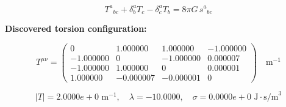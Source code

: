 
\begin{equation}
  T^a{}_{bc} + \delta^a_b T_c - \delta^a_c T_b = 8\pi G \, s^a{}_{bc}
\end{equation}

\textbf{Discovered torsion configuration:}

\begin{equation}
  T^{\mu\nu} = \begin{pmatrix}
    0 & 1.000000 & 1.000000 & -1.000000 \\
    -1.000000 & 0 & -1.000000 & 0.000007 \\
    -1.000000 & 1.000000 & 0 & 0.000001 \\
    1.000000 & -0.000007 & -0.000001 & 0
  \end{pmatrix} \quad \text{m}^{-1}
\end{equation}

\begin{equation}
  |T| = 2.0000e+0 \text{ m}^{-1}, \quad
  \lambda = -10.0000, \quad
  \sigma = 0.0000e+0 \text{ J}\cdot\text{s/m}^3
\end{equation}